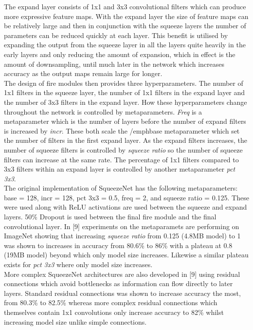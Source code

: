 \documentclass{article}
\begin{document}
The expand layer consists of 1x1 and 3x3 convolutional filters which can produce more expressive feature maps. With the expand layer the size of feature maps can be relatively large and then in conjunction with the squeeze layers the number of parameters can be reduced quickly at each layer. This benefit is utilised by expanding the output from the squeeze layer in all the layers quite heavily in the early layers and only reducing the amount of expansion, which in effect is the amount of downsampling, until much later in the network which increases accuracy as the output maps remain large for longer.\\

The design of fire modules then provides three hyperparameters. The number of 1x1 filters in the squeeze layer, the number of 1x1 filters in the expand layer and the number of 3x3 filters in the expand layer. How these hyperparameters change throughout the network is controlled by metaparameters. \emph{Freq} is a metaparameter which is the number of layers before the number of expand filters is increased by \emph{incr}. These both scale the /emph{base} metaparameter which set the number of filters in the first expand layer. As the expand filters increases, the number of squeeze filters is controlled by \emph{squeeze ratio} so the number of squeeze filters can increase at the same rate. The percentage of 1x1 filters compared to 3x3 filters within an expand layer is controlled by another metaparameter \emph{pct 3x3}. \\

The original implementation of SqueezeNet has the following metaparameters: base = 128, incr = 128, pct 3x3 = 0.5, freq = 2, and squeeze ratio = 0.125. These were used along with ReLU activations are used between the squeeze and expand layers. 50\% Dropout is used between the final fire module and the final convolutional layer. In [9] experiments on the metaparamets are performing on ImageNet showing that increasing \emph{squeeze ratio} from 0.125 (4.8MB model) to 1 was shown to increases in accuracy from 80.6\% to 86\% with a plateau at 0.8 (19MB model) beyond which only model size increases. Likewise a similar plateau exists for \emph{pct 3x3} where only model size increases.\\

More complex SqueezeNet architectures are also developed in [9] using residual connections which avoid bottlenecks as information can flow directly to later layers. Standard residual connections was shown to increase accuracy the most, from 80.3\% to 82.5\% whereas more complex residual connections which themselves contain 1x1 convolutions only increase accuracy to 82\% whilst increasing model size unlike simple connections.\\
\end{document}
